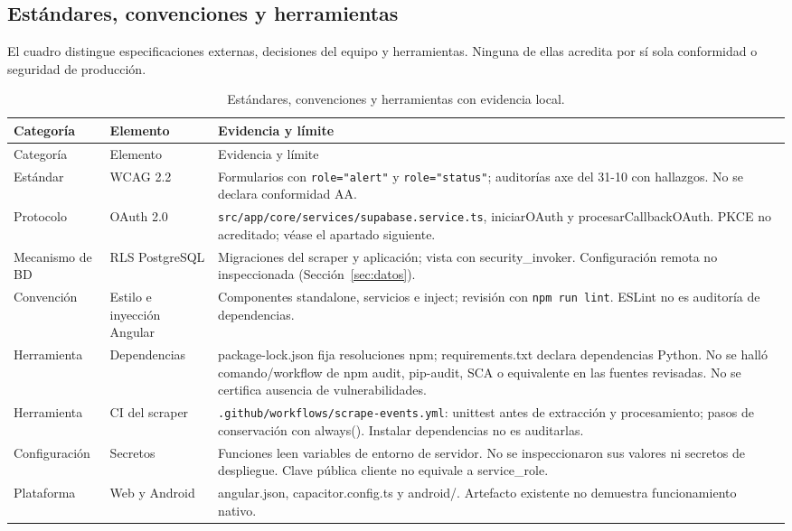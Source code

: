 \documentclass[11pt,a4paper]{article}
\begin{document}
\subsection{Estándares, convenciones y herramientas}
El cuadro distingue especificaciones externas, decisiones del equipo y herramientas.
Ninguna de ellas acredita por sí sola conformidad o seguridad de producción.
\begin{longtable}{p{2.7cm}p{3.2cm}p{7.7cm}}
\caption{Estándares, convenciones y herramientas con evidencia local.}\label{tab:estandares}\\
\toprule Categoría & Elemento & Evidencia y límite \\\midrule\endfirsthead
\toprule Categoría & Elemento & Evidencia y límite \\\midrule\endhead
Estándar & WCAG 2.2 & Formularios con \texttt{role="alert"} y \texttt{role="status"}; auditorías axe del 31-10 con hallazgos. No se declara conformidad AA. \\
Protocolo & OAuth 2.0 & \nolinkurl{src/app/core/services/supabase.service.ts}, iniciarOAuth y procesarCallbackOAuth. PKCE no acreditado; véase el apartado siguiente. \\
Mecanismo de BD & RLS PostgreSQL & Migraciones del scraper y aplicación; vista con security\_invoker. Configuración remota no inspeccionada (Sección~\ref{sec:datos}). \\
Convención & Estilo e inyección Angular & Componentes standalone, servicios e inject; revisión con \texttt{npm run lint}. ESLint no es auditoría de dependencias. \\
Herramienta & Dependencias & package-lock.json fija resoluciones npm; requirements.txt declara dependencias Python. No se halló comando/workflow de npm audit, pip-audit, SCA o equivalente en las fuentes revisadas. No se certifica ausencia de vulnerabilidades. \\
Herramienta & CI del scraper & \nolinkurl{.github/workflows/scrape-events.yml}: unittest antes de extracción y procesamiento; pasos de conservación con always(). Instalar dependencias no es auditarlas. \\
Configuración & Secretos & Funciones leen variables de entorno de servidor. No se inspeccionaron sus valores ni secretos de despliegue. Clave pública cliente no equivale a service\_role. \\
Plataforma & Web y Android & angular.json, capacitor.config.ts y android/. Artefacto existente no demuestra funcionamiento nativo. \\
\bottomrule\end{longtable}
\end{document}
